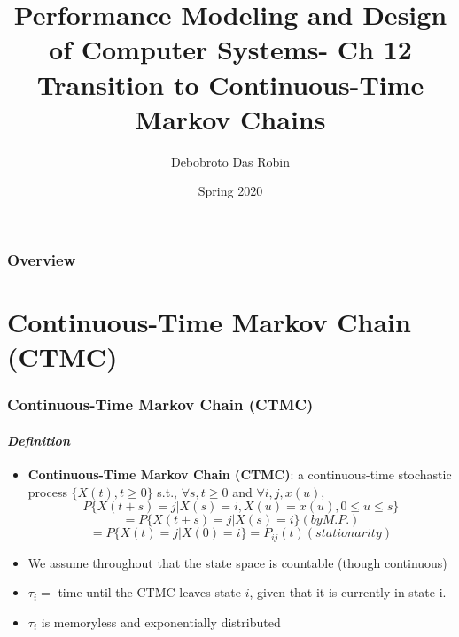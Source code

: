 \documentclass{beamer}
\title{Performance Modeling and
Design of Computer Systems- Ch 12 \\
Transition to Continuous-Time
Markov Chains}
\author{Debobroto Das Robin} %
\institute{Kent State University}
\date{Spring 2020}
\begin{document}
\begin{frame}
        \titlepage
        \begin{center}
    \href{mailto:drobin@kent.edu}{}
        \end{center}
\end{frame}

\begin{frame}
\frametitle{Overview} %
\tableofcontents %
\end{frame}



\section{ Continuous-Time Markov Chain (CTMC) }



\begin{frame} 
\frametitle{Continuous-Time Markov Chain (CTMC) }
\framesubtitle{\textbf{\textit{Definition}}}
\begin{itemize}
\item  \textbf{Continuous-Time Markov Chain (CTMC)}:  a continuous-time
stochastic process $\{X(t), t \geq 0\}$ s.t., $ \forall s, t \geq 0$ and $ \forall i, j, x(u)$,
$$P \{X(t + s) = j | X(s) = i, X(u) = x(u), 0 \leq u \leq s\}  $$
$$= P \{X(t + s) = j | X(s) = i\} (by M.P.) $$
$$ = P \{X(t) = j | X(0) = i\} = P_{ij} (t) (stationarity)$$
\item We assume throughout that the state space is countable (though continuous)
\item  $\tau_i =$ time until the CTMC leaves state $i$, given that it is currently in state i. 
\item $\tau_i $ is memoryless and exponentially distributed

\end{itemize}


	
\end{frame}
\end{document}
